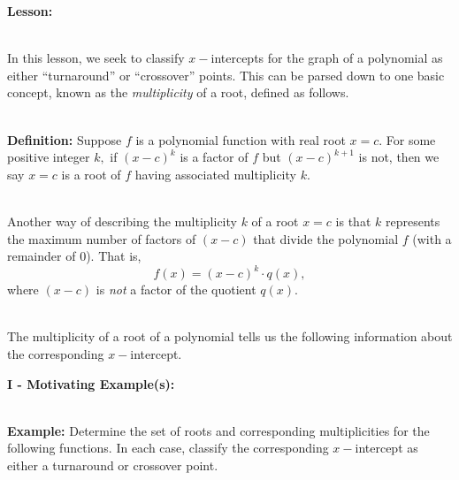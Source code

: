 \documentclass[12pt]{article}
\theoremstyle{definition}
\begin{document}
{\bf Lesson:}\\
\ \par
In this lesson, we seek to classify $x-$intercepts for the graph of a polynomial as either ``turnaround'' or ``crossover'' points.  This can be parsed down to one basic concept, known as the {\it multiplicity} of a root, defined as follows.\\
\ \par
{\bf Definition:} Suppose $f$ is a polynomial function with real root $x=c$.  For some positive integer $k,$ if $(x-c)^{k}$ is a factor of $f$ but $(x-c)^{k+1}$ is not, then we say $x=c$ is a root of $f$ having associated multiplicity $k$.\\
\ \par
Another way of describing the multiplicity $k$ of a root $x=c$ is that $k$ represents the maximum number of factors of $(x-c)$ that divide the polynomial $f$ (with a remainder of $0$).  That is,
$$f(x)=(x-c)^k\cdot q(x),$$
where $(x-c)$ is {\it not} a factor of the quotient $q(x)$.\\
\ \par
The multiplicity of a root of a polynomial tells us the following information about the corresponding $x-$intercept.
\begin{center}
\end{center}
\newpage
{\bf I - Motivating Example(s):}\\
\ \par
{\bf Example:} Determine the set of roots and corresponding multiplicities for the following functions.  In each case, classify the corresponding $x-$intercept as either a turnaround or crossover point.
\end{document}
